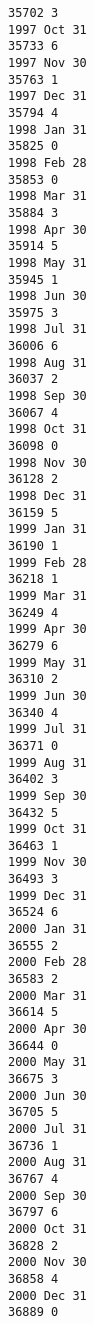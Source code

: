 \documentclass[11pt]{article}
\begin{document}
\begin{Verbatim}[commandchars=\\\{\}]
35702 3
1997 Oct 31
35733 6
1997 Nov 30
35763 1
1997 Dec 31
35794 4
1998 Jan 31
35825 0
1998 Feb 28
35853 0
1998 Mar 31
35884 3
1998 Apr 30
35914 5
1998 May 31
35945 1
1998 Jun 30
35975 3
1998 Jul 31
36006 6
1998 Aug 31
36037 2
1998 Sep 30
36067 4
1998 Oct 31
36098 0
1998 Nov 30
36128 2
1998 Dec 31
36159 5
1999 Jan 31
36190 1
1999 Feb 28
36218 1
1999 Mar 31
36249 4
1999 Apr 30
36279 6
1999 May 31
36310 2
1999 Jun 30
36340 4
1999 Jul 31
36371 0
1999 Aug 31
36402 3
1999 Sep 30
36432 5
1999 Oct 31
36463 1
1999 Nov 30
36493 3
1999 Dec 31
36524 6
2000 Jan 31
36555 2
2000 Feb 28
36583 2
2000 Mar 31
36614 5
2000 Apr 30
36644 0
2000 May 31
36675 3
2000 Jun 30
36705 5
2000 Jul 31
36736 1
2000 Aug 31
36767 4
2000 Sep 30
36797 6
2000 Oct 31
36828 2
2000 Nov 30
36858 4
2000 Dec 31
36889 0

    \end{Verbatim}
\end{document}
